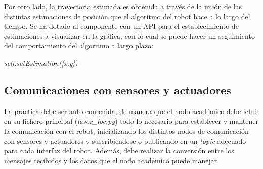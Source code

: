 Por otro lado, la trayectoria estimada es obtenida a través de la unión de las distintas estimaciones de posición que el algoritmo del robot hace a lo largo del tiempo. Se ha dotado al componente con un API para el establecimiento de estimaciones a visualizar en la gráfica, con lo cual se puede hacer un seguimiento del comportamiento del algoritmo a largo plazo:

\hspace{0.32\linewidth} \textit{self.setEstimation([x,y])}
 
\subsection{Comunicaciones con sensores y actuadores}
La práctica debe ser auto-contenida, de manera que el nodo académico debe icluir en su fichero principal (\textit{laser\_loc.py}) todo lo necesario para establecer y mantener la comunicación con el robot, inicializando los distintos nodos de comunicación con sensores y actuadores y suscribiendose o publicando en un \textit{topic} adecuado para cada interfaz del robot. Además, debe realizar la conversión entre los mensajes recibidos y los datos que el nodo académico puede manejar. 

